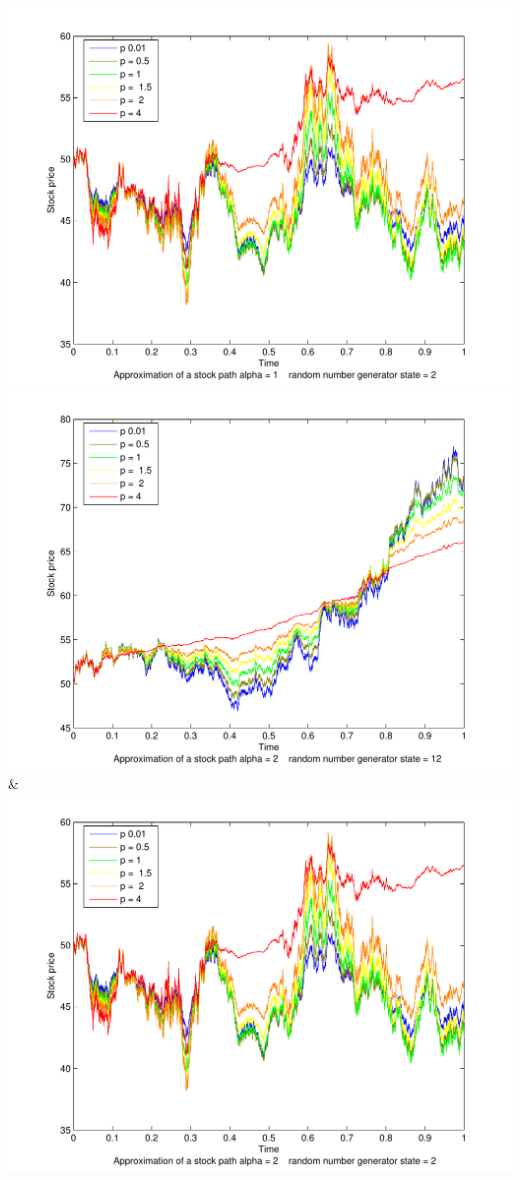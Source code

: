 \documentclass[a4paper,onecolumn]{IEEEtran}
\begin{document}
{			\includegraphics[width=\stockplotsize]{stock_s2_alpha1}\NN\cmidrule(lr){1-2}
		 \includegraphics[width=\stockplotsize]{stock_alpha2}&
			\includegraphics[width=\stockplotsize]{stock_s2_a2}\LL
			}
		
\end{document}
